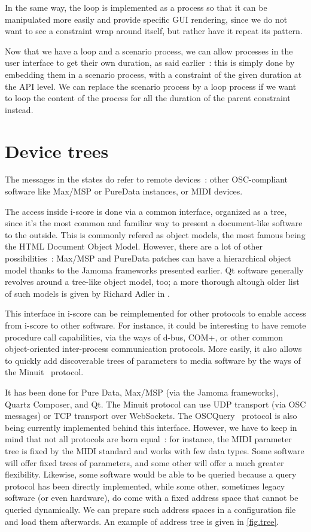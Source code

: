 \documentclass{sigchi}
\begin{document}
In the same way, the loop is implemented as a process so that it can be manipulated more easily and provide specific GUI rendering, since we do not want to see a constraint wrap around itself, but rather have it repeat its pattern.

Now that we have a loop and a scenario process, we can allow processes in the user interface to get their own duration, as said earlier~: this is simply done by embedding them in a scenario process, with a constraint of the given duration at the API level. We can replace the scenario process by a loop process if we want to loop the content of the process for all the duration of the parent constraint instead.

\section{Device trees}
The messages in the states do refer to remote devices~: other OSC-compliant software like Max/MSP or PureData instances, or MIDI devices. 

The access inside i-score is done via a common interface, organized as a tree, since it's the most common and familiar way to present a document-like software to the outside. This is commonly refered as object models, the most famous being the HTML Document Object Model. However, there are a lot of other possibilities~: Max/MSP and PureData patches can have a hierarchical object model thanks to the Jamoma frameworks presented earlier. Qt software generally revolves around a tree-like object model, too; a more thorough altough older list of such models is given by Richard Adler in \cite{adler1995emerging}.  

This interface in i-score can be reimplemented for other protocols to enable access from i-score to other software. For instance, it could be interesting to have remote procedure call capabilities, via the ways of d-bus, COM+, or other common object-oriented inter-process communication protocols. More easily, it also allows to quickly add discoverable trees of parameters to media software by the ways of the Minuit~\cite{baltazar2009virage}
protocol. 

It has been done for Pure Data, Max/MSP (via the Jamoma frameworks\cite{place2006jamoma}), Quartz Composer, and Qt. The Minuit protocol can use UDP transport (via OSC messages) or TCP transport over WebSockets. The OSCQuery~\cite{oscquery} 
protocol is also being currently implemented behind this interface. However, we have to keep in mind that not all protocols are born equal~: for instance, the MIDI parameter tree is fixed by the MIDI standard and works with few data types. Some software will offer fixed trees of parameters, and some other will offer a much greater flexibility. Likewise, some software would be able to be queried because a query protocol has been directly implemented, while some other, sometimes legacy software (or even hardware), do come with a fixed address space that cannot be queried dynamically. We can prepare such address spaces in a configuration file and load them afterwards. An example of address tree is given in \ref{fig.tree}.
\end{document}
